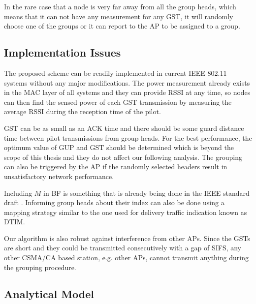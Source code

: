 In the rare case that a node is very far away from all the group heads, which means that it can not have any measurement for any GST, it will randomly choose one of the groups or it can report to the AP to be assigned to a group.
 


\subsection{Implementation Issues}
The proposed scheme can be readily implemented in current IEEE 802.11 systems without any major modifications. The power measurement already exists in the MAC layer of all systems and they can provide RSSI at any time, so nodes can then find the sensed power of each GST transmission by measuring the average RSSI during the reception time of the pilot. 

GST can be as small as an ACK time and there should be some guard distance time between pilot transmissions from group heads. For the best performance, the optimum value of GUP and GST should be determined which is beyond the scope of this thesis and they do not affect our following analysis. The grouping can also be triggered by the AP if the randomly selected headers result in unsatisfactory network performance.

Including $M$ in BF is something that is already being done in the IEEE standard draft \cite{Draft80211ah}. Informing group heads about their index can also be done using a mapping strategy similar to the one used for delivery traffic indication known as DTIM.

Our algorithm is also robust against interference from other APs. Since the GSTs are short and they could be transmitted consecutively with a gap of SIFS, any other CSMA/CA based station, e.g. other APs, cannot transmit anything during the grouping procedure.

\subsection{Analytical Model}

